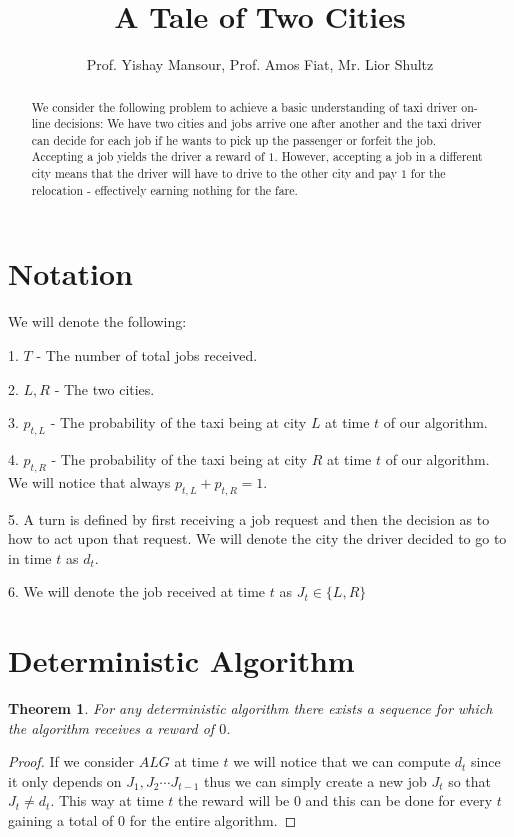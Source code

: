 \documentclass[]{article}
\title{A Tale of Two Cities}
\author{Prof. Yishay Mansour, Prof. Amos Fiat, Mr. Lior Shultz}
\newtheorem{theorem}{Theorem}
\begin{document}
\maketitle

\begin{abstract}

We consider the following problem to achieve a basic understanding of taxi driver on-line decisions:
	We have two cities and jobs arrive one after another and the taxi driver can decide for each job if he wants to pick up the passenger or forfeit the job.
	Accepting a job yields the driver a reward of $ 1 $. However, accepting a job in a different city means that the driver will have to drive to the other city and pay $ 1 $ for the relocation - effectively earning nothing for the fare.

\end{abstract}

\section{Notation}

We will denote the following:

1. $ T $ - The number of total jobs received.

2. $ L , R $ - The two cities.

3. $ p_{t,L} $ - The probability of the taxi being at city $ L $ at time $ t $ of our algorithm.

4. $ p_{t,R} $ - The probability of the taxi being at city $ R $ at time $ t $ of our algorithm. We will notice that always $ p_{t,L} + p_{t,R} = 1 $.

5. A turn is defined by first receiving a job request and then the decision as to how to act upon that request. We will denote the city the driver decided to go to in time $ t $ as $ d_t $.

6. We will denote the job received at time $ t $ as $ J_t \in \{L,R\} $ 

\section{Deterministic Algorithm}

\begin{theorem}
	For any deterministic algorithm there exists a sequence for which the algorithm receives a reward of $ 0 $.
\end{theorem}

\begin{proof}
	If we consider $ ALG $ at time $ t $ we will notice that we can compute $ d_t $ since it only depends on $ J_1,J_2 \cdots J_{t-1} $ thus we can simply create a new job $ J_t $ so that $ J_t \neq d_t $. This way at time $ t $ the reward will be $ 0 $ and this can be done for every $ t $ gaining a total of $ 0 $ for the entire algorithm.
\end{proof}
\end{document}
